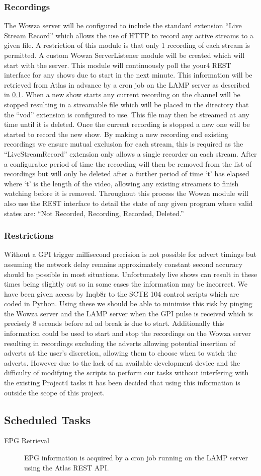 \subsubsection{Recordings}
The Wowza server will be configured to include the standard extension ``Live Stream Record'' which allows the use of HTTP to record any active streams to a given file. A restriction of this module is that only 1 recording of each stream is permitted. A custom Wowza ServerListener module will be created which will start with the server. This module will continuously poll the your4 REST interface for any shows due to start in the next minute. This information will be retrieved from Atlas in advance by a cron job on the LAMP server as described in \ref{subsec:ScheduledTasks}. When a new show starts any current recording on the channel will be stopped resulting in a streamable file which will be placed in the directory that the ``vod'' extension is configured to use. This file may then be streamed at any time until it is deleted. Once the current recording is stopped a new one will be started to record the new show. By making a new recording end existing recordings we ensure mutual exclusion for each stream, this is required as the ``LiveStreamRecord'' extension only allows a single recorder on each stream. After a configurable period of time the recording will then be removed from the list of recordings but will only be deleted after a further period of time `t' has elapsed where `t' is the length of the video, allowing any existing streamers to finish watching before it is removed. Throughout this process the Wowza module will also use the REST interface to detail the state of any given program where valid states are: ``Not Recorded, Recording, Recorded, Deleted.''

\subsubsection{Restrictions}
Without a GPI trigger millisecond precision is not possible for advert timings but assuming the network delay remains approximately constant second accuracy should be possible in most situations. Unfortunately live shows can result in these times being slightly out so in some cases the information may be incorrect. We have been given access by Inqb8r to the SCTE 104 control scripts which are coded in Python. Using these we should be able to minimise this risk by pinging the Wowza server and the LAMP server when the GPI pulse is received which is precisely 8 seconds before ad ad break is due to start. Additionally this information could be used to start and stop the recordings on the Wowza server resulting in recordings excluding the adverts allowing potential insertion of adverts at the user's discretion, allowing them to choose when to watch the adverts. However due to the lack of an available development device and the difficulty of modifying the scripts to perform our tasks without interfering with the existing Project4 tasks it has been decided that using this information is outside the scope of this project.

\subsection{Scheduled Tasks}\label{subsec:ScheduledTasks}
\begin{description}
\item[EPG Retrieval]{EPG information is acquired by a cron job running on the LAMP server using the Atlas REST API.}
\end{description}

